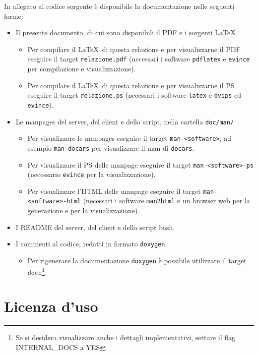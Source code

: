 \documentclass[a4paper,10pt]{article}
\begin{document}
In allegato al codice sorgente \`e disponibile la documentazione nelle seguenti forme:
\begin{itemize}
	\item Il presente documento, di cui sono disponibili il PDF e i sorgenti \LaTeX\
	\begin{itemize}
		\item Per compilare il \LaTeX\ di questa relazione e per visualizzarne il PDF eseguire il target \texttt{relazione.pdf} (necessari i software \texttt{pdflatex} e \texttt{evince} per compilazione e visualizzazione).
		\item Per compilare il \LaTeX\ di questa relazione e per visualizzarne il PS eseguire il target \texttt{relazione.ps} (necessari i software \texttt{latex} e \texttt{dvips} ed \texttt{evince}).
	\end{itemize}
	\item Le manpages del server, del client e dello script, nella cartella \texttt{doc/man/}
	\begin{itemize}
		\item Per visualizzare le manpages eseguire il target \texttt{man-<software>}, ad esempio \texttt{man-docars} per visualizzare il man di \texttt{docars}.
		\item Per visualizzare il PS delle manpage eseguire il target \texttt{man-<software>-ps} (necessario \texttt{evince} per la visualizzazione).
		\item Per visualizzare l'HTML delle manpage eseguire il target \texttt{man-<software>-html} (necessari i software \texttt{man2html} e un browser web per la generazione e per la visualizzazione).
	\end{itemize}		
	\item I README del server, del client e dello script bash.
	\item I commenti al codice, redatti in formato \texttt{doxygen}.
	\begin{itemize}
		\item Per rigenerare la documentazione \texttt{doxygen} \`e possibile utilizzare il target \texttt{docu}\footnote{Se si desidera visualizzare anche i dettagli implementativi, settare il flag INTERNAL\_DOCS a YES}.
	\end{itemize}
\end{itemize}

\section{Licenza d'uso}
\end{document}
